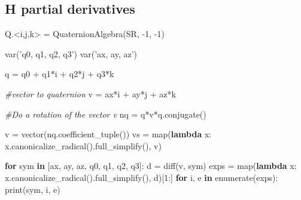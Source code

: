 \documentclass[]{article}
\newenvironment{Shaded}{}{}
\newcommand{\KeywordTok}[1]{\textcolor[rgb]{0.00,0.44,0.13}{\textbf{#1}}}
\newcommand{\DecValTok}[1]{\textcolor[rgb]{0.25,0.63,0.44}{#1}}
\newcommand{\StringTok}[1]{\textcolor[rgb]{0.25,0.44,0.63}{#1}}
\newcommand{\CommentTok}[1]{\textcolor[rgb]{0.38,0.63,0.69}{\textit{#1}}}
\newcommand{\ControlFlowTok}[1]{\textcolor[rgb]{0.00,0.44,0.13}{\textbf{#1}}}
\newcommand{\OperatorTok}[1]{\textcolor[rgb]{0.40,0.40,0.40}{#1}}
\newcommand{\BuiltInTok}[1]{#1}
\newcommand{\NormalTok}[1]{#1}
\begin{document}
\subsection{H partial derivatives}\label{h-partial-derivatives}

\begin{Shaded}
\begin{Highlighting}[]
\NormalTok{Q.}\OperatorTok{<}\NormalTok{i,j,k}\OperatorTok{>} \OperatorTok{=}\NormalTok{ QuaternionAlgebra(SR, }\OperatorTok{-}\DecValTok{1}\NormalTok{, }\OperatorTok{-}\DecValTok{1}\NormalTok{)}

\NormalTok{var(}\StringTok{'q0, q1, q2, q3'}\NormalTok{)}
\NormalTok{var(}\StringTok{'ax, ay, az'}\NormalTok{)}

\NormalTok{q }\OperatorTok{=}\NormalTok{ q0 }\OperatorTok{+}\NormalTok{ q1}\OperatorTok{*}\NormalTok{i }\OperatorTok{+}\NormalTok{ q2}\OperatorTok{*}\NormalTok{j }\OperatorTok{+}\NormalTok{ q3}\OperatorTok{*}\NormalTok{k}

\CommentTok{#vector to quaternion}
\NormalTok{v }\OperatorTok{=}\NormalTok{ ax}\OperatorTok{*}\NormalTok{i }\OperatorTok{+}\NormalTok{ ay}\OperatorTok{*}\NormalTok{j }\OperatorTok{+}\NormalTok{ az}\OperatorTok{*}\NormalTok{k}

\CommentTok{#Do a rotation of the vector v}
\NormalTok{nq }\OperatorTok{=}\NormalTok{ q}\OperatorTok{*}\NormalTok{v}\OperatorTok{*}\NormalTok{q.conjugate()}

\NormalTok{v }\OperatorTok{=}\NormalTok{ vector(nq.coefficient_tuple())}
\NormalTok{vs }\OperatorTok{=} \BuiltInTok{map}\NormalTok{(}\KeywordTok{lambda}\NormalTok{ x: x.canonicalize_radical().full_simplify(), v)}

\ControlFlowTok{for}\NormalTok{ sym }\KeywordTok{in}\NormalTok{ [ax, ay, az, q0, q1, q2, q3]:}
\NormalTok{    d }\OperatorTok{=}\NormalTok{ diff(v, sym)}
\NormalTok{    exps }\OperatorTok{=} \BuiltInTok{map}\NormalTok{(}\KeywordTok{lambda}\NormalTok{ x: x.canonicalize_radical().full_simplify(), d)[}\DecValTok{1}\NormalTok{:]}
    \ControlFlowTok{for}\NormalTok{ i, e }\KeywordTok{in} \BuiltInTok{enumerate}\NormalTok{(exps):}
        \BuiltInTok{print}\NormalTok{(sym, i, e) }
        

\end{Highlighting}
\end{Shaded}
\end{document}
